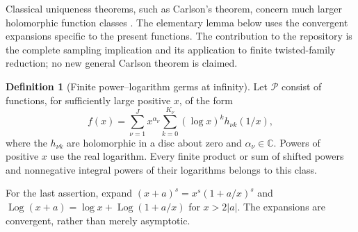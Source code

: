 \documentclass[11pt]{article}
\numberwithin{equation}{section}
\theoremstyle{plain}
\theoremstyle{definition}
\newtheorem{definition}[theorem]{Definition}
\theoremstyle{remark}
\DeclareMathOperator{\Log}{Log}
\newcommand{\C}{\mathbb C}
\begin{document}
Classical uniqueness theorems, such as Carlson's theorem, concern much
larger holomorphic function classes \cite{Pila}. The elementary lemma
below uses the convergent expansions specific to the present functions.
The contribution to the repository is the complete sampling implication
and its application to finite twisted-family reduction; no new general
Carlson theorem is claimed.

\begin{definition}[Finite power--logarithm germs at infinity]
\label{sampling:class}
Let $\mathscr P$ consist of functions, for sufficiently large positive
$x$, of the form
\begin{equation}\label{sampling:germ}
 f(x)=\sum_{\nu=1}^J x^{\alpha_\nu}
           \sum_{k=0}^{K_\nu}(\log x)^k h_{\nu k}(1/x),
\end{equation}
where the $h_{\nu k}$ are holomorphic in a disc about zero and
$\alpha_\nu\in\C$. Powers of positive $x$ use the real logarithm.
Every finite product or sum of shifted powers and nonnegative integral
powers of their logarithms belongs to this class.
\end{definition}

For the last assertion, expand
$(x+a)^s=x^s(1+a/x)^s$ and
$\Log(x+a)=\log x+\Log(1+a/x)$ for $x>2|a|$.
The expansions are convergent, rather than merely asymptotic.
\end{document}
